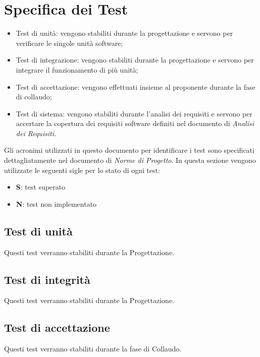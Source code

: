 \section{Specifica dei Test}
\begin{itemize}
\item Test di unità: vengono stabiliti durante la progettazione e servono per verificare le singole unità software;
\item Test di integrazione: vengono stabiliti durante la progettazione e servono per integrare il funzionamento di più unità;
\item Test di accettazione: vengono effettuati insieme al proponente durante la fase di collaudo;
\item Test di sistema: vengono stabiliti durante l'analisi dei requisiti e servono per accertare la copertura dei requisiti software definiti nel documento di \textit{Analisi dei Requisiti}.
\end{itemize}
Gli acronimi utilizzati in questo documento per identificare i test sono specificati dettagliatamente nel documento di \textit{Norme di Progetto}.
In questa sezione vengono utilizzate le seguenti sigle per lo stato di ogni test:
\begin{itemize}
\item \textbf{S}: test superato
\item \textbf{N}: test non implementato
\end{itemize}

\subsection{Test di unità}
Questi test verranno stabiliti durante la Progettazione.

\subsection{Test di integrità}
Questi test verranno stabiliti durante la Progettazione.

\subsection{Test di accettazione}
Questi test verranno stabiliti durante la fase di Collaudo.

